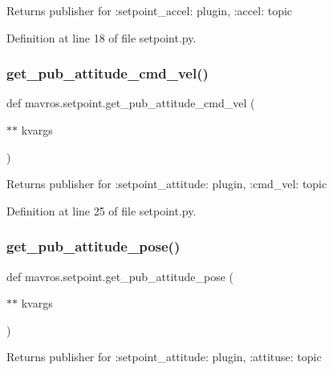 \begin{DoxyVerb}Returns publisher for :setpoint_accel: plugin, :accel: topic
\end{DoxyVerb}
 

Definition at line 18 of file setpoint.\+py.

\mbox{\label{namespacemavros_1_1setpoint_ae856b3bec00ce8f060de2b5feb586d75}} 
\subsubsection{\texorpdfstring{get\_pub\_attitude\_cmd\_vel()}{get\_pub\_attitude\_cmd\_vel()}}
{\footnotesize\ttfamily def mavros.\+setpoint.\+get\+\_\+pub\+\_\+attitude\+\_\+cmd\+\_\+vel (\begin{DoxyParamCaption}\item[{$\ast$$\ast$}]{kvargs }\end{DoxyParamCaption})}

\begin{DoxyVerb}Returns publisher for :setpoint_attitude: plugin, :cmd_vel: topic
\end{DoxyVerb}
 

Definition at line 25 of file setpoint.\+py.

\mbox{\label{namespacemavros_1_1setpoint_a1270f4dbcb7a3da0205ef7e54724e3f7}} 
\subsubsection{\texorpdfstring{get\_pub\_attitude\_pose()}{get\_pub\_attitude\_pose()}}
{\footnotesize\ttfamily def mavros.\+setpoint.\+get\+\_\+pub\+\_\+attitude\+\_\+pose (\begin{DoxyParamCaption}\item[{$\ast$$\ast$}]{kvargs }\end{DoxyParamCaption})}

\begin{DoxyVerb}Returns publisher for :setpoint_attitude: plugin, :attituse: topic
\end{DoxyVerb}
 

